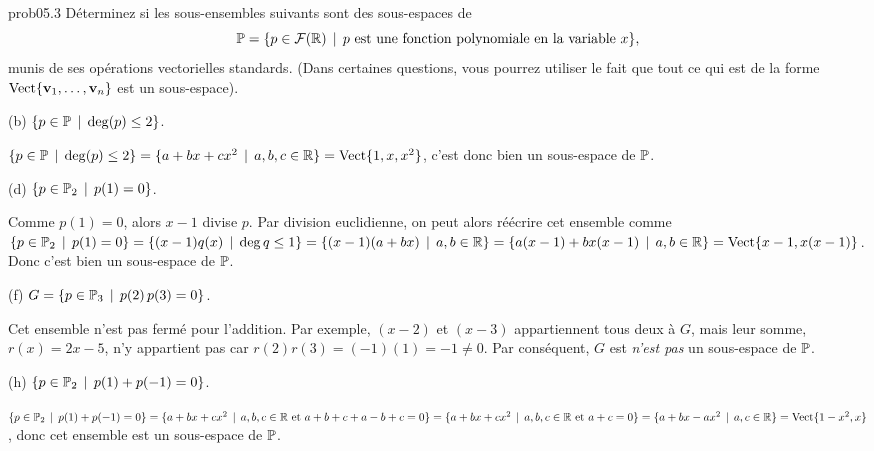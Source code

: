 \bigskip
\begin{sol}{prob05.3} Déterminez si les sous-ensembles suivants sont des sous-espaces de $$\mathbb{P} =\{p \in \mathcal{F}(\mathbb{R}) \, \mid \, p \text{ est une fonction polynomiale en la variable } x\},$$ munis de ses opérations vectorielles standards. (Dans certaines questions, vous pourrez utiliser le fait que tout ce qui est de la forme $\operatorname{ Vect} \normalsize\{\mathbf{v}_1, \dots, \mathbf{v}_n\normalsize\}$ est un sous-espace).
 
\medskip
 

(b) $\{p \in \mathbb{P}   \, \mid \, \deg(p)
\le 2 \}$. 

\soln $\{p \in \mathbb{P}   \, \mid \, \deg(p)
\le 2 \}= \{a +bx +cx^2   \, \mid \, a,b,c\in \mathbb{R}\}=\operatorname{ Vect} \normalsize\{1, x, x^2\normalsize\}$, c'est donc bien un sous-espace de $\mathbb{P}$.\medskip 
 

 

(d)  $ \{p \in \mathbb{P}_2 \, \mid \,  p(1)=0\}$. 

\soln Comme $p(1)=0$, alors  $x-1$ divise $p$.   Par division euclidienne, on peut alors r\'e\'ecrire cet ensemble comme $ \{p \in \mathbb{P}_2 \, \mid \,  p(1)=0\}=\{(x-1)q(x)\, \mid \, \deg q \le 1\}=\{(x-1)(a+bx) \, \mid \, a,b \in \mathbb{R}\}=\{a(x-1)+ bx(x-1) \, \mid \, a,b \in \mathbb{R}\}=\operatorname{ Vect} \normalsize\{x-1, x(x-1)\normalsize\}$. Donc c'est bien un sous-espace de $\mathbb{P}$. \medskip




(f) $G=\{p \in \mathbb{P}_3 \, \mid \,  p(2)\,p(3)=0\}$. 

\soln Cet ensemble n'est pas fermé pour l'addition. Par exemple, $(x-2)$ et $(x-3)$ appartiennent tous deux à $G$, mais leur somme, $r(x)=2x-5$, n'y appartient pas car $r(2)r(3)=(-1)(1)=-1\not=0$. Par conséquent, $G$ est {\it n'est pas} un sous-espace de $\mathbb{P}$.\medskip


(h) $ \{p \in \mathbb{P}_2 \, \mid \,  p(1)+p(-1)=0\}$. 

\soln   $ \{p \in \mathbb{P}_2 \, \mid \,  p(1)+p(-1)=0\}=\{a+bx +cx^2  \, \mid \,  a,b,c \in \mathbb{R} \text{ et } a+b+c+a-b+c=0\}=\{a+bx +cx^2  \, \mid \,  a,b,c \in \mathbb{R} \text{ et } a+c=0\}=\{a +bx -ax^2  \, \mid \,  a, c \in \mathbb{R}\}=\operatorname{ Vect} \normalsize\{1- x^2, x\normalsize\}$, donc cet ensemble est un sous-espace de $\mathbb{P}$.\medskip


 
\end{sol}

